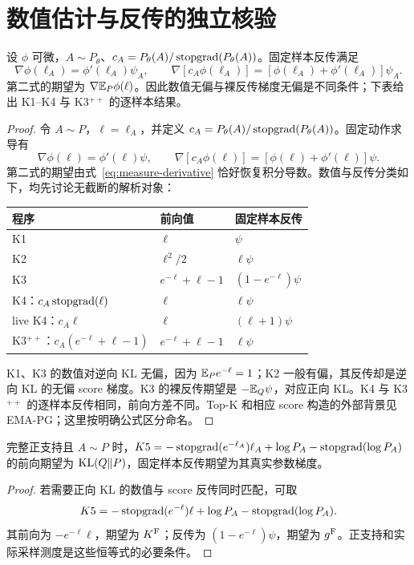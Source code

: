\section{数值估计与反传的独立核验}
\begin{proposition}[固定样本反传与积分导数]
设 $\phi$ 可微，$A\sim P_\theta$、$c_A=P_\theta(A)/\operatorname{stopgrad}(P_\theta(A))$。固定样本反传满足
\begin{equation}
\nabla\phi(\ell_A)=\phi'(\ell_A)\psi_A,\qquad
\nabla[c_A\phi(\ell_A)]=[\phi(\ell_A)+\phi'(\ell_A)]\psi_A.
\end{equation}
第二式的期望为 $\nabla\mathbb E_P\phi(\ell)$。因此数值无偏与裸反传梯度无偏是不同条件；下表给出 K1--K4 与 K3$^{++}$ 的逐样本结果。
\end{proposition}
\begin{proof}
令 $A\sim P$，$\ell=\ell_A$，并定义 $c_A=P_\theta(A)/\operatorname{stopgrad}(P_\theta(A))$。固定动作求导有
\begin{equation}
\nabla\phi(\ell)=\phi'(\ell)\psi,\qquad
\nabla[c_A\phi(\ell)]=[\phi(\ell)+\phi'(\ell)]\psi.
\end{equation}
第二式的期望由式~\eqref{eq:measure-derivative} 恰好恢复积分导数。数值与反传分类如下，均先讨论无截断的解析对象：
\begin{center}
\small
\begin{tabular}{lll}
\toprule
程序 & 前向值 & 固定样本反传\\
\midrule
K1 & $\ell$ & $\psi$\\
K2 & $\ell^2/2$ & $\ell\psi$\\
K3 & $e^{-\ell}+\ell-1$ & $(1-e^{-\ell})\psi$\\
K4：$c_A\operatorname{stopgrad}(\ell)$ & $\ell$ & $\ell\psi$\\
live K4：$c_A\ell$ & $\ell$ & $(\ell+1)\psi$\\
K3$^{++}$：$c_A(e^{-\ell}+\ell-1)$ & $e^{-\ell}+\ell-1$ & $\ell\psi$\\
\bottomrule
\end{tabular}
\end{center}
K1、K3 的数值对逆向 KL 无偏，因为 $\mathbb E_Pe^{-\ell}=1$；K2 一般有偏，其反传却是逆向 KL 的无偏 score 梯度。K3 的裸反传期望是 $-\mathbb E_Q\psi$，对应正向 KL。K4 与 K3$^{++}$ 的逐样本反传相同，前向方差不同。Top-K 和相应 score 构造的外部背景见 EMA-PG；这里按明确公式区分命名。
\end{proof}

\begin{proposition}[K5 的双重无偏性]
完整正支持且 $A\sim P$ 时，$K5=-\operatorname{stopgrad}(e^{-\ell_A})\ell_A+\log P_A-\operatorname{stopgrad}(\log P_A)$ 的前向期望为 $\operatorname{KL}(Q\Vert P)$，固定样本反传期望为其真实参数梯度。
\end{proposition}
\begin{proof}
若需要正向 KL 的数值与 score 反传同时匹配，可取
\begin{equation}
K5=-\operatorname{stopgrad}(e^{-\ell})\ell+\log P_A-\operatorname{stopgrad}(\log P_A).
\end{equation}
其前向为 $-e^{-\ell}\ell$，期望为 $K^{\rm F}$；反传为 $(1-e^{-\ell})\psi$，期望为 $g^{\rm F}$。正支持和实际采样测度是这些恒等式的必要条件。
\end{proof}

